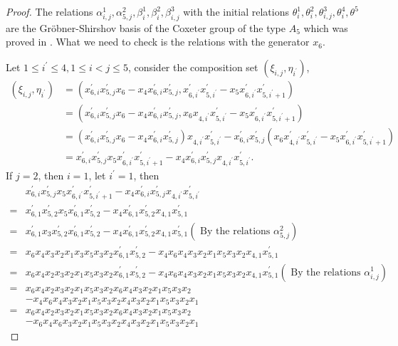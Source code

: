 \documentclass[UTF8]{amsart}
\theoremstyle{definition}
\theoremstyle{remark}
\numberwithin{equation}{section}
\begin{document}
\begin{proof}
The relations $\alpha_{i,j}^1,\alpha_{5,j}^2,\beta_i^1,\beta_i^2,\beta_{i,j}^3$ with the initial relations $\theta_i^1,\theta_i^2,\theta_{i,j}^3,\theta_i^4,\theta^5$ are the Gr\"{o}bner-Shirshov basis of the Coxeter group of the type $A_5$ which was proved in \cite{MR1857281}. What we need to check is the relations with the generator $x_6$.\par
Let $1\leq i^{'}\leq 4, 1\leq i<j\leq 5$, consider the composition set $(\xi_{i,j},\eta_{i^{'}})$,
\begin{align*}
(\xi_{i,j},\eta_{i^{'}})&=(x_{6,i}^{'}x_{5,j}^{'}x_6-x_4x_{6,i}^{'}x_{5,j}^{'},x_{6,i^{'}}^{'}x_{5,i^{'}}^{'}-x_5x_{6,i^{'}}^{'}x_{5,i^{'}+1}^{'})\\
&=(x_{6,i}^{'}x_{5,j}^{'}x_6-x_4x_{6,i}^{'}x_{5,j}^{'},x_6x_{4,i^{'}}x_{5,i^{'}}^{'}-x_5x_{6,i^{'}}^{'}x_{5,i^{'}+1}^{'})\\
&=(x_{6,i}^{'}x_{5,j}^{'}x_6-x_4x_{6,i}^{'}x_{5,j}^{'})x_{4,i^{'}}x_{5,i^{'}}^{'}-x_{6,i}^{'}x_{5,j}^{'}(x_6x_{4,i^{'}}^{'}x_{5,i^{'}}^{'}-x_5x_{6,i^{'}}^{'}x_{5,i^{'}+1}^{'})\\
&=x_{6,i}^{'}x_{5,j}^{'}x_5x_{6,i^{'}}^{'}x_{5,i^{'}+1}^{'}-x_4x_{6,i}^{'}x_{5,j}^{'}x_{4,i^{'}}x_{5,i^{'}}^{'}.
\end{align*}
If $j=2$, then $i=1$, let $i^{'}=1$, then
\begin{align*}
 &x_{6,i}^{'}x_{5,j}^{'}x_5x_{6,i^{'}}^{'}x_{5,i^{'}+1}^{'}-x_4x_{6,i}^{'}x_{5,j}^{'}x_{4,i^{'}}x_{5,i^{'}}^{'}\\
 =&x_{6,1}^{'}x_{5,2}^{'}x_5x_{6,1}^{'}x_{5,2}^{'}-x_4x_{6,1}^{'}x_{5,2}^{'}x_{4,1}x_{5,1}^{'}\\
 =&x_{6,1}^{'}x_3x_{5,2}^{'}x_{6,1}^{'}x_{5,2}^{'}-x_4x_{6,1}^{'}x_{5,2}^{'}x_{4,1}x_{5,1}^{'}
 (\mbox{ By the relations }\alpha_{5,j}^2)\\
 =&x_{6}x_4x_3x_2x_1x_3x_{5}x_3x_2x_{6,1}^{'}x_{5,2}^{'}-x_4x_{6}x_4x_3x_2x_1x_{5}x_3x_2x_{4,1}x_{5,1}^{'}\\
 =&x_{6}x_4x_2x_3x_2x_1x_{5}x_3x_2x_{6,1}^{'}x_{5,2}^{'}-x_4x_{6}x_4x_3x_2x_1x_{5}x_3x_2x_{4,1}x_{5,1}^{'}
 (\mbox{ By the relations }\alpha_{i,j}^1)\\
 =&x_{6}x_4x_2x_3x_2x_1x_{5}x_3x_2x_{6}x_4x_3x_2x_1x_{5}x_3x_2\\
 &-x_4x_{6}x_4x_3x_2x_1x_{5}x_3x_2x_{4}x_3x_2x_1x_{5}x_3x_2x_1\\
 =&x_{6}x_4x_2x_3x_2x_1x_{5}x_3x_2x_{6}x_4x_3x_2x_1x_{5}x_3x_2\\
 &-x_6x_{4}x_6x_3x_2x_1x_{5}x_3x_2x_{4}x_3x_2x_1x_{5}x_3x_2x_1

\end{align*}
\end{proof}
\end{document}

